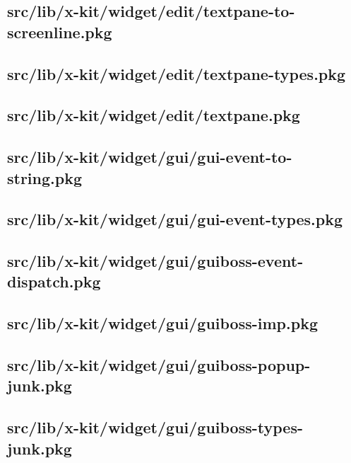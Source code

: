 \subsection{src/lib/x-kit/widget/edit/textpane-to-screenline.pkg}


\subsection{src/lib/x-kit/widget/edit/textpane-types.pkg}


\subsection{src/lib/x-kit/widget/edit/textpane.pkg}


\subsection{src/lib/x-kit/widget/gui/gui-event-to-string.pkg}


\subsection{src/lib/x-kit/widget/gui/gui-event-types.pkg}


\subsection{src/lib/x-kit/widget/gui/guiboss-event-dispatch.pkg}


\subsection{src/lib/x-kit/widget/gui/guiboss-imp.pkg}


\subsection{src/lib/x-kit/widget/gui/guiboss-popup-junk.pkg}


\subsection{src/lib/x-kit/widget/gui/guiboss-types-junk.pkg}


